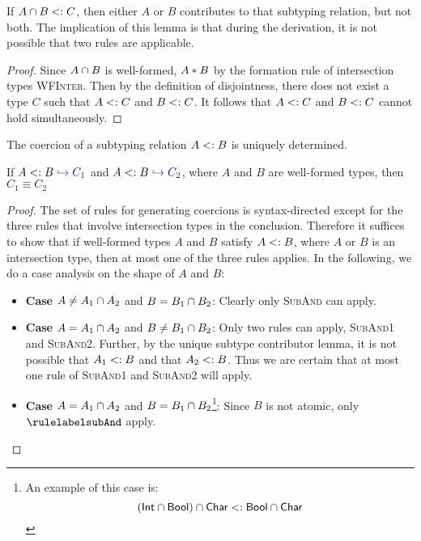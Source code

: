 \documentclass[preprint]{sigplanconf}
\begin{document}
If $A \cap B <: C$, then either $A$ or $B$ contributes to that subtyping relation, but not both. The implication of this lemma is that during the derivation, it is not possible that two rules are applicable.

\newcommand{\wfinterlabel}{\textsc{WFInter}}

\begin{proof}
Since $A \cap B$ is well-formed, $A * B$ by the formation rule of intersection types \wfinterlabel. Then by the definition of disjointness, there does not exist a type $C$ such that $A <: C$ and $B <: C$. It follows that $A <: C$ and $B <: C$ cannot hold simultaneously.
\end{proof}

The coercion of a subtyping relation $A <: B$ is uniquely determined.

\begin{lemma} \label{unique-coercion}
If $A \subtype B \yields {C_1}$ and $A \subtype B \yields {C_2}$, where $A$ and $B$ are well-formed types, then $C_1 \equiv C_2$
\end{lemma}

\begin{proof}
The set of rules for generating coercions is syntax-directed except for the three rules that involve intersection types in the conclusion. Therefore it suffices to show that if well-formed types $A$ and $B$ satisfy $A <: B$, where $A$ or $B$ is an intersection type, then at most one of the three rules applies. In the following, we do a case analysis on the shape of $A$ and $B$:

\begin{itemize}
  \item \textbf{Case} $A \neq A_1 \cap A_2$ and $B = B_1 \cap B_2$: Clearly only \textsc{SubAnd} can apply.
  \item \textbf{Case} $A = A_1 \cap A_2$ and $B \neq B_1 \cap B_2$: Only two rules can apply, \textsc{SubAnd1} and \textsc{SubAnd2}. Further, by the unique subtype contributor lemma, it is not possible that $A_1 <: B$ and that $A_2 <: B$. Thus we are certain that at most one rule of \textsc{SubAnd1} and \textsc{SubAnd2} will apply.
  \item \textbf{Case} $A = A_1 \cap A_2$ and $B = B_1 \cap B_2$\footnote{An example of this case is:
    \[ (\textsf{Int} \cap \textsf{Bool}) \cap \textsf{Char} <: \textsf{Bool} \cap \textsf{Char} \]}: Since $B$ is not atomic, only $\rulelabelsubAnd$ apply.

\end{itemize}

\end{proof}
\end{document}
